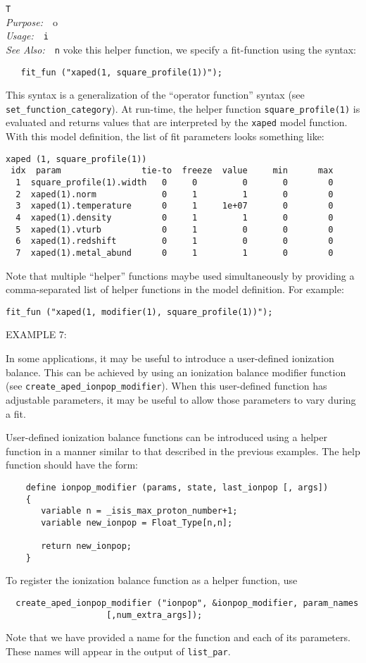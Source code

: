 \documentclass{book}
\makeatletter
\newif\ifpdf
\newenvironment{isisfunction}[4]%
{\index{{#1}@{\tt #1}}%
  \ifpdf
  \else
     \addcontentsline{toc}{subsection}{{#1} -- {#2}}
  \fi
  \vbox{
          \vspace*{\baselineskip}
          {\LARGE\tt #1}\vspace*{\baselineskip}\\
          {{\it Purpose:}~~{#2}}\\
          {{\it Usage:}~~{\tt #3}}\\
          {{\it See Also:}~~{\tt #4}}
       }
}%
{ }
\makeatother
\begin{document}
{\begin{isisfunction}
To invoke this helper function, we specify a fit-function using the syntax:
\begin{verbatim}
   fit_fun ("xaped(1, square_profile(1))");
\end{verbatim}
This syntax is a generalization of the ``operator function'' syntax (see
\verb|set_function_category|).  At run-time, the helper function
\verb|square_profile(1)| is evaluated and returns values that are interpreted
by the \verb|xaped| model function. With this model definition, the list of
fit parameters looks something like:
\begin{verbatim}
xaped (1, square_profile(1))
 idx  param                tie-to  freeze  value     min      max
  1  square_profile(1).width   0     0         0       0        0
  2  xaped(1).norm             0     1         1       0        0
  3  xaped(1).temperature      0     1     1e+07       0        0
  4  xaped(1).density          0     1         1       0        0
  5  xaped(1).vturb            0     1         0       0        0
  6  xaped(1).redshift         0     1         0       0        0
  7  xaped(1).metal_abund      0     1         1       0        0
\end{verbatim}

Note that multiple ``helper'' functions maybe used simultaneously by providing
a comma-separated list of helper functions in the model definition.  For
example:
\begin{verbatim}
fit_fun ("xaped(1, modifier(1), square_profile(1))");
\end{verbatim}

EXAMPLE 7:

In some applications, it may be useful to introduce a user-defined ionization
balance.  This can be achieved by using an ionization balance modifier
function (see \verb|create_aped_ionpop_modifier|). When this user-defined
function has adjustable parameters, it may be useful to allow those parameters
to vary during a fit.

User-defined ionization balance functions can be introduced using a helper
function in a manner similar to that described in the previous examples.
The help function should have the form:
\begin{verbatim}
    define ionpop_modifier (params, state, last_ionpop [, args])
    {
       variable n = _isis_max_proton_number+1;
       variable new_ionpop = Float_Type[n,n];

       return new_ionpop;
    }
\end{verbatim}
To register the ionization balance function as a helper function, use
\begin{verbatim}
  create_aped_ionpop_modifier ("ionpop", &ionpop_modifier, param_names
                    [,num_extra_args]);
\end{verbatim}
Note that we have provided a name for the function and each of its parameters.
These names will appear in the output of \verb|list_par|.


\end{isisfunction}}
\end{document}
